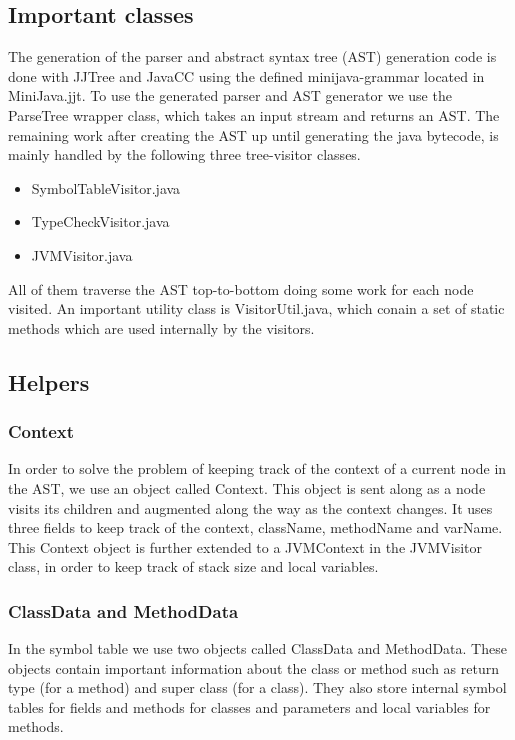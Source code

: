 \documentclass[paper=a4, fontsize=11pt]{scrartcl} %
\numberwithin{equation}{section} %
\numberwithin{figure}{section} %
\numberwithin{table}{section} %
\begin{document}
\subsection{Important classes}
The generation of the parser and abstract syntax tree (AST) generation code is done with JJTree and JavaCC using the defined minijava-grammar located in MiniJava.jjt. To use the generated parser and AST generator we use the ParseTree wrapper class, which takes an input stream and returns an AST. The remaining work after creating the AST up until generating the java bytecode, is mainly handled by the following three tree-visitor classes.
\begin{itemize}
  \item{SymbolTableVisitor.java}
  \item{TypeCheckVisitor.java}
  \item{JVMVisitor.java}
\end{itemize}
All of them traverse the AST top-to-bottom doing some work for each node visited. An important utility class is VisitorUtil.java, which conain a set of static methods which are used internally by the visitors.
\subsection{Helpers}
\subsubsection*{Context}
In order to solve the problem of keeping track of the context of a current node in the AST, we use an object called Context. This object is sent along as a node visits its children and augmented along the way as the context changes. It uses three fields to keep track of the context, className, methodName and varName. This Context object is further extended to a JVMContext in the JVMVisitor class, in order to keep track of stack size and local variables.
\subsubsection*{ClassData and MethodData}
In the symbol table we use two objects called ClassData and MethodData. These objects contain important information about the class or method such as return type (for a method) and super class (for a class). They also store internal symbol tables for fields and methods for classes and parameters and local variables for methods.
\end{document}
